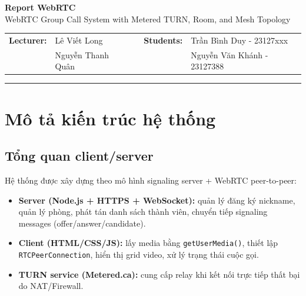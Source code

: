 \documentclass[12pt,a4paper]{article}
\begin{document}
\begin{center}
    {\LARGE \textbf{Report WebRTC}}\\[0.5em]
    {\large WebRTC Group Call System with Metered TURN, Room, and Mesh Topology}\\[2em]

    \begin{tabular}{p{} l p{} p{} l}
        \textbf{Lecturer:}   & Lê Viết Long         & & \textbf{Students:} & Trần Bình Duy - 23127xxx \\
        \textbf{} & Nguyễn Thanh Quân     & &                    & Nguyễn Văn Khánh - 23127388 \\

    \end{tabular}
\end{center}


\vspace{1em}
\hrule
\vspace{1em}

\section{Mô tả kiến trúc hệ thống}

\subsection{Tổng quan client/server}
Hệ thống được xây dựng theo mô hình signaling server + WebRTC peer-to-peer:
\begin{itemize}[leftmargin=1.5em]
  \item \textbf{Server (Node.js + HTTPS + WebSocket):} quản lý đăng ký nickname, quản lý phòng, phát tán danh sách thành viên, chuyển tiếp signaling messages (offer/answer/candidate).
  \item \textbf{Client (HTML/CSS/JS):} lấy media bằng \texttt{getUserMedia()}, thiết lập \texttt{RTCPeerConnection}, hiển thị grid video, xử lý trạng thái cuộc gọi.
  \item \textbf{TURN service (Metered.ca):} cung cấp relay khi kết nối trực tiếp thất bại do NAT/Firewall.
\end{itemize}
\end{document}
